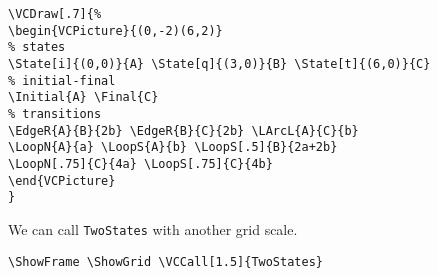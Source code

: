 \documentclass[11pt,twoside]{article}
\newlength{\parindenttemp} %
\newcommand{\noi}{\noindent}
\newcommand{\ee}{\text{\qquad}}               %
\newlength{\jsIndent}%
\newlength{\ColSource}%
\newlength{\ColFigur}%
\begin{document}
\noi 
\hspace*{-\jsIndent}
\begin{minipage}[c]{\ColFigur}%
\par\vspace*{0mm}%
\begin{center}
%
\end{center}
\end{minipage}%
\hspace*{1.2em}%
\begin{minipage}[c]{\ColSource}
\setlength{\parindent}{\parindenttemp}%
\par\vspace*{0mm}%
\footnotesize
\begin{verbatim}
\VCDraw[.7]{%
\begin{VCPicture}{(0,-2)(6,2)}
% states
\State[i]{(0,0)}{A} \State[q]{(3,0)}{B} \State[t]{(6,0)}{C}
% initial-final
\Initial{A} \Final{C}
% transitions 
\EdgeR{A}{B}{2b} \EdgeR{B}{C}{2b} \LArcL{A}{C}{b}
\LoopN{A}{a} \LoopS{A}{b} \LoopS[.5]{B}{2a+2b} 
\LoopN[.75]{C}{4a} \LoopS[.75]{C}{4b}
\end{VCPicture}
}
\end{verbatim}
\normalsize
\end{minipage}%

We can call \verb+TwoStates+ with another grid scale.

\noi 
\hspace*{-\jsIndent}
\begin{minipage}[t]{\ColFigur}%
\par\vspace*{0mm}%
\ee \ShowFrame  \ShowGrid {}

\end{minipage}%
\hspace*{1.2em}%
\begin{minipage}[t]{\ColSource}
\setlength{\parindent}{\parindenttemp}%
\par\vspace*{0mm}%
\medskip
\bigskip
\footnotesize
\begin{verbatim}
\ShowFrame \ShowGrid \VCCall[1.5]{TwoStates}
\end{verbatim}
\normalsize
\end{minipage}%
\end{document}
